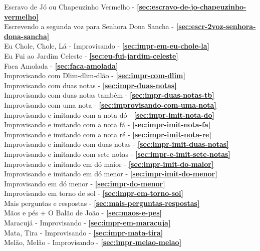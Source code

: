 Escravo de Jó ou Chapeuzinho Vermelho - \textbf{\ref{sec:escravo-de-jo-chapeuzinho-vermelho}} \\
Escrevendo a segunda voz para Senhora Dona Sancha - \textbf{\ref{sec:escr-2voz-senhora-dona-sancha}} \\
Eu Chole, Chole, Lá - Improvisando - \textbf{\ref{sec:impr-em-eu-chole-la}} \\
Eu Fui ao  Jardim Celeste - \textbf{\ref{sec:eu-fui-jardim-celeste}} \\
Faca Amolada - \textbf{\ref{sec:faca-amolada}} \\
Improvisando com Dlim-dlim-dlão - \textbf{\ref{sec:impr-com-dlim}} \\
Improvisando com duas notas - \textbf{\ref{sec:impr-duas-notas}} \\
Improvisando com duas notas também - \textbf{\ref{sec:impr-duas-notas-tb}} \\
Improvisando com uma nota - \textbf{\ref{sec:improvisando-com-uma-nota}} \\
Improvisando e imitando com a nota dó - \textbf{\ref{sec:impr-imit-nota-do}} \\
Improvisando e imitando com a nota fá - \textbf{\ref{sec:impr-imit-nota-fa}} \\
Improvisando e imitando com a nota ré - \textbf{\ref{sec:impr-imit-nota-re}} \\
Improvisando e imitando com duas notas - \textbf{\ref{sec:impr-imit-duas-notas}} \\
Improvisando e imitando com sete notas - \textbf{\ref{sec:impr-e-imit-sete-notas}} \\
Improvisando e imitando em dó maior - \textbf{\ref{sec:impr-imit-do-maior}} \\
Improvisando e imitando em dó menor - \textbf{\ref{sec:impr-imit-do-menor}} \\
Improvisando em dó menor - \textbf{\ref{sec:impr-do-menor}} \\
Improvisando em torno de sol - \textbf{\ref{sec:impr-em-torno-sol}} \\
Mais perguntas e respostas - \textbf{\ref{sec:mais-perguntas-respostas}} \\
Mãos e pés + O Balão de João - \textbf{\ref{sec:maos-e-pes}} \\
Maracujá - Improvisando - \textbf{\ref{sec:impr-em-maracuja}} \\
Mata, Tira - Improvisando - \textbf{\ref{sec:impr-mata-tira}} \\
Melão, Melão - Improvisando - \textbf{\ref{sec:impr-melao-melao}} \\
